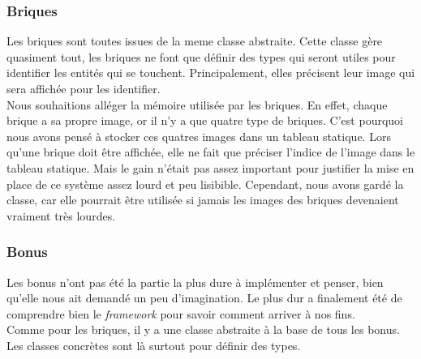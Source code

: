 \documentclass[a4paper,10pt]{article}
\begin{document}
    \subsubsection{Briques}
        Les briques sont toutes issues de la meme classe abstraite. Cette classe gère quasiment tout, les briques ne font
        que définir des types qui seront utiles pour identifier les entités qui se touchent. Principalement, elles
        précisent leur image qui sera affichée pour les identifier. \\

        Nous souhaitions alléger la mémoire utilisée par les briques. En effet, chaque brique a sa propre image, or
        il n'y a que quatre type de briques. C'est pourquoi nous avons pensé à stocker ces quatres images dans un
        tableau statique. Lors qu'une brique doit être affichée, elle ne fait que préciser l'indice de l'image
        dans le tableau statique. Mais le gain n'était pas assez important pour justifier la mise en place de
        ce système assez lourd et peu lisibible. Cependant, nous avons gardé la classe, car elle pourrait être
        utilisée si jamais les images des briques devenaient vraiment très lourdes.

    \subsubsection{Bonus}
        Les bonus n'ont pas été la partie la plus dure à implémenter et penser, bien qu'elle nous ait demandé un peu
        d'imagination. Le plus dur a finalement été de comprendre bien le \textit{framework} pour savoir
        comment arriver à nos fins. \\

        Comme pour les briques, il y a une classe abstraite à la base de tous les bonus. Les classes concrètes
        sont là surtout pour définir des types.
\end{document}
